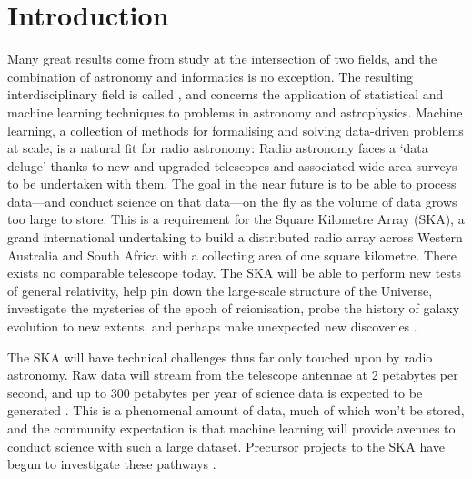 \chapter{Introduction}
\label{cha:intro}



Many great results come from study at the intersection of two fields, and the combination of astronomy and informatics is no exception. The resulting interdisciplinary field is called , and concerns the application of statistical and machine learning techniques to problems in astronomy and astrophysics.
Machine learning, a collection of methods for formalising and solving data-driven problems at scale, is a natural fit for radio astronomy: Radio astronomy faces a `data deluge' thanks to new and upgraded telescopes and associated wide-area surveys to be undertaken with them. The goal in the near future is to be able to process data---and conduct science on that data---on the fly as the volume of data grows too large to store. This is a requirement for the Square Kilometre Array (SKA), a grand international undertaking to build a distributed radio array across Western Australia and South Africa with a collecting area of one square kilometre. There exists no comparable telescope today. The SKA will be able to perform new tests of general relativity, help pin down the large-scale structure of the Universe, investigate the mysteries of the epoch of reionisation, probe the history of galaxy evolution to new extents, and perhaps make unexpected new discoveries \citep{diamond_ska_2017}.

The SKA will have technical challenges thus far only touched upon by radio astronomy. Raw data will stream from the telescope antennae at 2 petabytes per second, and up to 300 petabytes per year of science data is expected to be generated \citep{diamond_ska_2017}. This is a phenomenal amount of data, much of which won't be stored, and the community expectation is that machine learning will provide avenues to conduct science with such a large dataset. Precursor projects to the SKA have begun to investigate these pathways \citep[e.g.][]{kapinska_emu_2020,mostert_unveiling_2020}.

